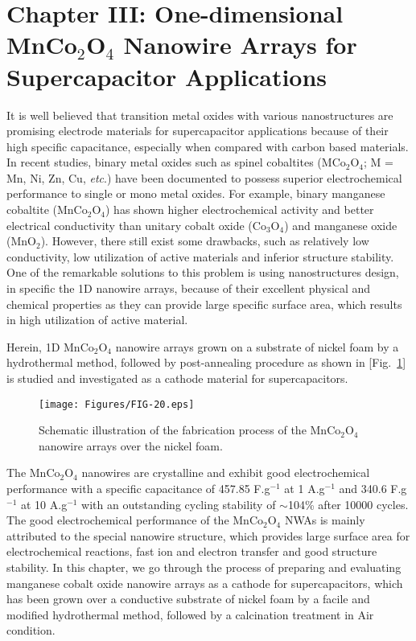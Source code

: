 \documentclass[reprint,amsmath,amssymb,aps,floatfix,
]{revtex4-2}
\begin{document}
\section*{\label{sec:level1}C\lowercase{hapter} III: O\lowercase{ne-dimensional} M\lowercase{n}C\lowercase{o}$_2$O$_4$ N\lowercase{anowire} A\lowercase{rrays for} S\lowercase{upercapacitor} A\lowercase{pplications}}
It is well believed that transition metal oxides with various nanostructures are promising electrode materials for supercapacitor applications because of their high specific capacitance, especially when compared with carbon based materials.\cite{Jiang2012} In recent studies, binary metal oxides such as spinel cobaltites (MCo$_2$O$_4$; M = Mn, Ni, Zn, Cu, {\it etc}.) have been documented to possess superior electrochemical performance to single or mono metal oxides.\cite{Li2014} For example, binary manganese cobaltite (MnCo$_2$O$_4$) has shown higher electrochemical activity and better electrical conductivity than unitary cobalt oxide (Co$_3$O$_4$) and manganese oxide (MnO$_2$).\cite{Kwun2016} However, there still exist some drawbacks, such as relatively low conductivity, low utilization of active materials and inferior structure stability. One of the remarkable solutions to this problem is using nanostructures design, in specific the 1D nanowire arrays, because of their excellent physical and chemical properties as they can provide large specific surface area, which results in high utilization of active material. 

Herein, 1D MnCo$_2$O$_4$ nanowire arrays grown on a substrate of nickel foam by a hydrothermal method, followed by post-annealing procedure as shown in [Fig.~\ref{fig:fig20}] is studied and investigated as a cathode material for supercapacitors.
\begin{figure}[b]
    \centering
    \texttt{[image: Figures/FIG-20.eps]}
    \caption{\label{fig:fig20}Schematic illustration of the fabrication process of the MnCo$_2$O$_4$ nanowire arrays over the nickel foam.}
    \end{figure}
The MnCo$_2$O$_4$ nanowires are crystalline and exhibit good electrochemical performance with a specific capacitance of 457.85 F.g$^{-1}$ at 1 A.g$^{-1}$ and 340.6 F.g$^{-1}$ at 10 A.g$^{-1}$ with an outstanding cycling stability of $\sim$104\% after 10000 cycles. The good electrochemical performance of the MnCo$_2$O$_4$ NWAs is mainly attributed to the special nanowire structure, which provides large surface area for electrochemical reactions, fast ion and electron transfer and good structure stability. In this chapter, we go through the process of preparing and evaluating manganese cobalt oxide nanowire arrays as a cathode for supercapacitors, which has been grown over a conductive substrate of nickel foam by a facile and modified hydrothermal method, followed by a calcination treatment in Air condition.
\end{document}
